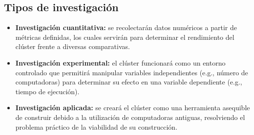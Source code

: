 \subsection{Tipos de investigación}
\label{section:tiposinv}

\begin{itemize}
  \item \textbf{Investigación cuantitativa:} se recolectarán datos numéricos a partir de métricas definidas, los cuales servirán para determinar el rendimiento del clúster frente a diversas comparativas.
  \item \textbf{Investigación experimental:} el clúster funcionará como un entorno controlado que permitirá manipular variables independientes (e.g., número de computadoras) para determinar su efecto en una variable dependiente (e.g., tiempo de ejecución).
  \item \textbf{Investigación aplicada:} se creará el clúster como una herramienta asequible de construir debido a la utilización de computadoras antiguas, resolviendo el problema práctico de la viabilidad de su construcción.
\end{itemize}